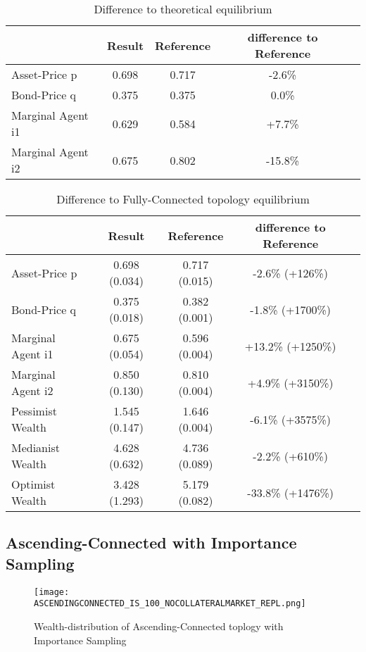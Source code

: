 \documentclass[Bachelorarbeit.tex]{subfiles}
\begin{document}
\begin{table}[H]
	\caption{Difference to theoretical equilibrium}
	\centering
	\begin{tabular} { l c c c r }
		& Result & Reference & difference to Reference \\
		\hline
		Asset-Price p & 0.698 & 0.717 & -2.6\% \\
		Bond-Price q & 0.375 & 0.375 & 0.0\% \\
		Marginal Agent i1 & 0.629  & 0.584 & +7.7\% \\
		Marginal Agent i2 & 0.675 & 0.802 & -15.8\% \\
		\hline
	\end{tabular}
\end{table}

\begin{table}[H]
	\caption{Difference to Fully-Connected topology equilibrium}
	\centering
	\begin{tabular} { l c c c r }
		& Result & Reference & difference to Reference \\
		\hline
		Asset-Price p & 0.698 (0.034) & 0.717 (0.015) & -2.6\% (+126\%) \\
		Bond-Price q & 0.375 (0.018) & 0.382 (0.001) & -1.8\% (+1700\%) \\
		Marginal Agent i1 & 0.675 (0.054) & 0.596 (0.004) & +13.2\% (+1250\%) \\
		Marginal Agent i2 & 0.850 (0.130) & 0.810 (0.004) & +4.9\% (+3150\%) \\
		\hline
		Pessimist Wealth & 1.545 (0.147) & 1.646 (0.004) & -6.1\% (+3575\%) \\
		Medianist Wealth & 4.628 (0.632) & 4.736 (0.089) & -2.2\% (+610\%) \\
		Optimist Wealth & 3.428 (1.293) & 5.179 (0.082) & -33.8\% (+1476\%) \\
		\hline
	\end{tabular}
\end{table}

\subsection{Ascending-Connected with Importance Sampling}
\begin{figure}[H]
	\centering
  \texttt{[image: ASCENDINGCONNECTED\_IS\_100\_NOCOLLATERALMARKET\_REPL.png]}
	\caption{Wealth-distribution of Ascending-Connected toplogy with Importance Sampling}
	\label{fig:wealth_ASCENDINGCONNECTED_IS_100_NOCOLLATERALMARKET_REPL}
\end{figure}
\end{document}
